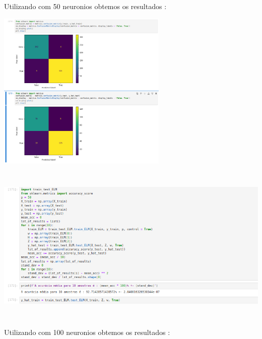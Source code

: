 \documentclass{article}
\begin{document}
\begin{center}
\begin{center}
\end{center}

\vspace{5pt}
Utilizando com 50 neuronios obtemos os resultados : 

\begin{center}

\includegraphics[height=3in]{Ex6/Breast_Cancer/matrix_conf_50.png}
\vspace{10pt}

\end{center}

\begin{center}

\includegraphics[height=3in]{Ex6/Breast_Cancer/acc_50.png}
\vspace{10pt}

\end{center}



\vspace{5pt}
Utilizando com 100 neuronios obtemos os resultados : 

\begin{center}


\end{center}
\end{center}
\end{document}
